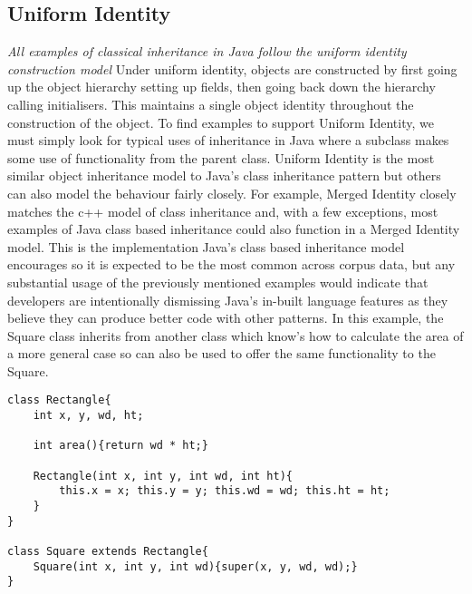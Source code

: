\subsection{Uniform Identity}
\textit{All examples of classical inheritance in Java follow the uniform identity construction model}\newline\newline
Under uniform identity, objects are constructed by first going up the object hierarchy setting up fields, then going back down the hierarchy calling initialisers. This maintains a single object identity throughout the construction of the object.\newline
To find examples to support Uniform Identity, we must simply look for typical uses of inheritance in Java where a subclass makes some use of functionality from the parent class. Uniform Identity is the most similar object inheritance model to Java’s class inheritance pattern but others can also model the behaviour fairly closely. For example, Merged Identity closely matches the c++ model of class inheritance and, with a few exceptions, most examples of Java class based inheritance could also function in a Merged Identity model. This is the implementation Java’s class based inheritance model encourages so it is expected to be the most common across corpus data, but any substantial usage of the previously mentioned examples would indicate that developers are intentionally dismissing Java’s in-built language features as they believe they can produce better code with other patterns.\newline
In this example, the Square class inherits from another class which know’s how to calculate the area of a more general case so can also be used to offer the same functionality to the Square. 
\begin{lstlisting}
class Rectangle{
	int x, y, wd, ht;
	
	int area(){return wd * ht;}
	
	Rectangle(int x, int y, int wd, int ht){
		this.x = x; this.y = y; this.wd = wd; this.ht = ht;
	}
}

class Square extends Rectangle{
	Square(int x, int y, int wd){super(x, y, wd, wd);}
}
\end{lstlisting}

